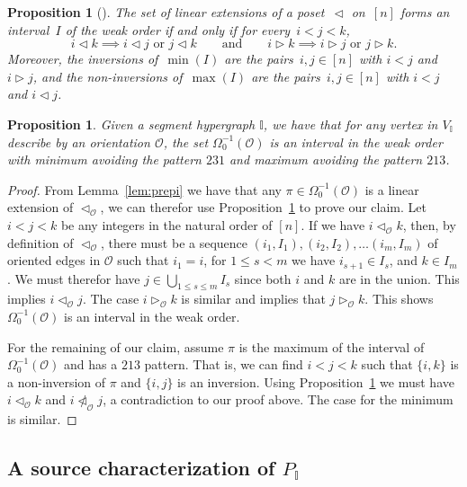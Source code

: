 \documentclass[reqno]{amsart}
\newtheorem{proposition}[theorem]{Proposition}
\theoremstyle{definition}
\newcommand{\less}{\vartriangleleft} %
\newcommand{\more}{\vartriangleright} %
\newcommand{\Or}{\mathcal O}  %
\newcommand{\II}{\mathbb I} %
\begin{document}
\begin{proposition}[{\cite[Thm.~6.8]{BjornerWachs}}]
\label{prop:WOIP}
The set of linear extensions of a poset~$\less$ on~$[n]$ forms an interval~$I$ of the weak order if and only if for every~$i < j < k$,
\[
i \less k \implies i \less j \text{ or } j \less k
\qquad\text{and}\qquad
i \more k \implies i \more j \text{ or } j \more k.
\]
Moreover, the inversions of~$\min(I)$ are the pairs~$i,j \in [n]$ with $i < j$ and $i \more j$, and the non-inversions of~$\max(I)$ are the pairs~$i,j \in [n]$ with $i < j$ and $i \less j$.
\end{proposition}


\begin{proposition}\label{prop:preimage}
 Given a segment hypergraph $\II$, we have that for any vertex in $V_{\II}$ describe by an orientation $\Or$, the set $\Omega_0^{-1}(\Or)$ is an interval 
 in the weak order with minimum avoiding the pattern $231$ and maximum avoiding the pattern $213$.
\end{proposition}

\begin{proof}
From Lemma~\ref{lem:prepi} we have that any $\pi\in \Omega_0^{-1}(\Or)$  is a linear extension of $\less_\Or$, we can therefor use Proposition~\ref{prop:WOIP} to prove our claim. 
Let $i<j<k$ be any integers in the natural order of $[n]$. If we have $i\less_{\Or} k$, then, by definition of $\less_\Or$, there must be a sequence $(i_1,I_{1}), (i_2,I_{2}),\ldots (i_m,I_{m})$ of oriented edges in $\Or$ such that
$i_1=i$, for $1\le s<m$ we have $i_{s+1}\in I_s$, and $k\in I_m$. We must therefor have $j\in\bigcup_{1\le s\le m} I_s$ since both $i$ and $k$ are in the union. This implies $i\less_{\Or} j$. The case $i\more_{\Or} k$ is similar and  implies
that $j\more_\Or k$. This shows $\Omega_0^{-1}(\Or)$ is an interval in the weak order.

For the remaining of our claim, assume $\pi$ is the maximum of the interval of $\Omega_0^{-1}(\Or)$ and has a $213$ pattern. That is,  we can find $i<j<k$ such that $\{i,k\}$ is a non-inversion of $\pi$ and $\{i,j\}$ is an inversion. Using Proposition~\ref{prop:WOIP} we must have $i\less_\Or k$ and $i\not\less_\Or j$, a contradiction to our proof above. The case for the minimum is similar.
\end{proof}


\subsection{A source characterization of $P_\II$}  
\label{subsec:sourceinc}
\end{document}
